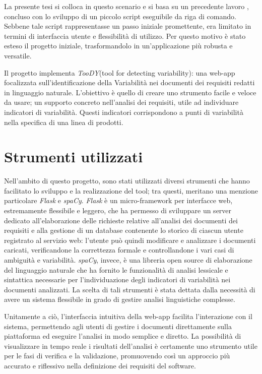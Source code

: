 \documentclass[12pt]{report}
\newcommand{\toody}{\textsl{TooDY}\xspace}
\newcommand{\flask}{\textsl{Flask}\xspace}
\newcommand{\spacy}{\textsl{spaCy}\xspace}
\begin{document}
La presente tesi si colloca in questo scenario e si basa su un precedente lavoro \cite{livi}, concluso con lo sviluppo di un piccolo script eseguibile da riga di comando. Sebbene tale script rappresentasse un passo iniziale promettente, era limitato in termini di interfaccia utente e flessibilità di utilizzo. Per questo motivo è stato esteso il progetto iniziale, trasformandolo in un'applicazione più robusta e versatile.

Il progetto implementa \toody (tool for detecting variability): una web-app focalizzata sull’identificazione della \textsf{Variabilità} nei documenti dei requisiti redatti in linguaggio naturale. L’obiettivo è quello di creare uno strumento facile e veloce da usare; un supporto concreto nell’analisi dei requisiti, utile ad individuare indicatori di variabilità. Questi indicatori corrispondono a punti di variabilità nella specifica di una linea di prodotti.


\section{Strumenti utilizzati}
Nell’ambito di questo progetto, sono stati utilizzati diversi strumenti che hanno facilitato lo sviluppo e la realizzazione del tool; tra questi, meritano una menzione particolare \flask e \spacy. \flask è un micro-framework per interfacce web, estremamente flessibile e leggero, che ha permesso di sviluppare un server dedicato all’elaborazione delle richieste relative all’analisi dei documenti dei requisiti e alla gestione di un database contenente lo storico di ciascun utente registrato al servizio web: l'utente può quindi modificare e analizzare i documenti caricati, verificandone la correttezza formale e controllandone i vari casi di ambiguità e variabilità. \spacy, invece, è una libreria open source di elaborazione del linguaggio naturale che ha fornito le funzionalità di analisi lessicale e sintattica necessarie per l’individuazione degli indicatori di variabilità nei documenti analizzati. La scelta di tali strumenti è stata dettata dalla necessità di avere un sistema flessibile in grado di gestire analisi linguistiche complesse.

Unitamente a ciò, l'interfaccia intuitiva della web-app facilita l'interazione con il sistema, permettendo agli utenti di gestire i documenti direttamente sulla piattaforma ed eseguire l'analisi in modo semplice e diretto. La possibilità di visualizzare in tempo reale i risultati dell'analisi è certamente uno strumento utile per le fasi di verifica e la validazione, promuovendo così un approccio più accurato e riflessivo nella definizione dei requisiti del software.
\end{document}
